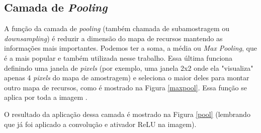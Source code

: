 \subsection{Camada de \textit{Pooling}}

A função da camada de \textit{pooling} (também chamada de subamostragem ou \textit{downsampling}) é reduzir a dimensão do mapa de recursos mantendo as informações mais importantes. Podemos ter a soma, a média ou \textit{Max Pooling}, que é a mais popular e também utilizada nesse trabalho. Essa última funciona definindo uma janela de \textit{pixels} (por exemplo, uma janela 2x2 onde ela "visualiza" apenas 4 \textit{pixels} do mapa de amostragem) e seleciona o maior deles para montar outro mapa de recursos, como é mostrado na Figura \ref{maxpool}. Essa função se aplica por toda a imagem \cite{freecodecamp}.

\begin{figure}[H]
	\centering
\end{figure}

O resultado da aplicação dessa camada é mostrado na Figura \ref{pool} (lembrando que já foi aplicado a convolução e ativador ReLU na imagem).

\begin{figure}[H]
	\centering
\end{figure}


